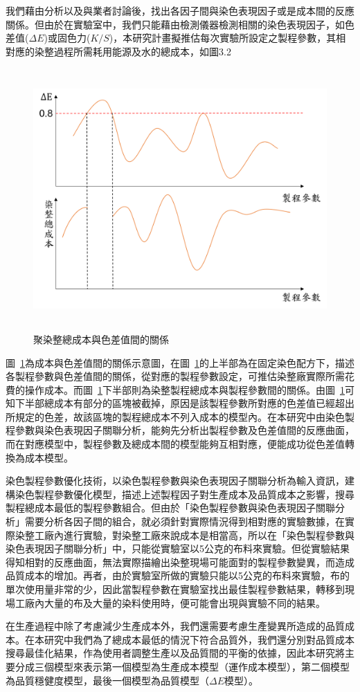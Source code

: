 我們藉由分析以及與業者討論後，找出各因子間與染色表現因子或是成本間的反應關係。但由於在實驗室中，我們只能藉由檢測儀器檢測相關的染色表現因子，如色差值($\Delta E$)或固色力($K/S$)，本研究計畫擬推估每次實驗所設定之製程參數，其相對應的染整過程所需耗用能源及水的總成本，如圖3.2
\begin{figure} 
\centering  
\includegraphics[width=12cm,height=10cm]{Graph/graph4.png}
\caption{聚染整總成本與色差值間的關係}
\label{fig:graph4}
\end{figure}

圖~\ref{fig:graph4}為成本與色差值間的關係示意圖，在圖~\ref{fig:graph4}的上半部為在固定染色配方下，描述各製程參數與色差值間的關係，從對應的製程參數設定，可推估染整廠實際所需花費的操作成本。而圖~\ref{fig:graph4}下半部則為染整製程總成本與製程參數間的關係。由圖~\ref{fig:graph4}可知下半部總成本有部分的區塊被截掉，原因是該製程參數所對應的色差值已經超出所規定的色差，故該區塊的製程總成本不列入成本的模型內。在本研究中由染色製程參數與染色表現因子關聯分析，能夠先分析出製程參數及色差值間的反應曲面，而在對應模型中，製程參數及總成本間的模型能夠互相對應，便能成功從色差值轉換為成本模型。

染色製程參數優化技術，以染色製程參數與染色表現因子關聯分析為輸入資訊，建構染色製程參數優化模型，描述上述製程因子對生產成本及品質成本之影響，搜尋製程總成本最低的製程參數組合。但由於「染色製程參數與染色表現因子關聯分析」需要分析各因子間的組合，就必須針對實際情況得到相對應的實驗數據，在實際染整工廠內進行實驗，對染整工廠來說成本是相當高，所以在「染色製程參數與染色表現因子關聯分析」中，只能從實驗室以5公克的布料來實驗。但從實驗結果得知相對的反應曲面，無法實際描繪出染整現場可能面對的製程參數變異，而造成品質成本的增加。再者，由於實驗室所做的實驗只能以5公克的布料來實驗，布的單次使用量非常的少，因此當製程參數在實驗室找出最佳製程參數結果，轉移到現場工廠內大量的布及大量的染料使用時，便可能會出現與實驗不同的結果。

在生產過程中除了考慮減少生產成本外，我們還需要考慮生產變異所造成的品質成本。在本研究中我們為了總成本最低的情況下符合品質外，我們還分別對品質成本搜尋最佳化結果，作為使用者調整生產以及品質間的平衡的依據，因此本研究將主要分成三個模型來表示第一個模型為生產成本模型（運作成本模型），第二個模型為品質穩健度模型，最後一個模型為品質模型（$\Delta E$模型）。
